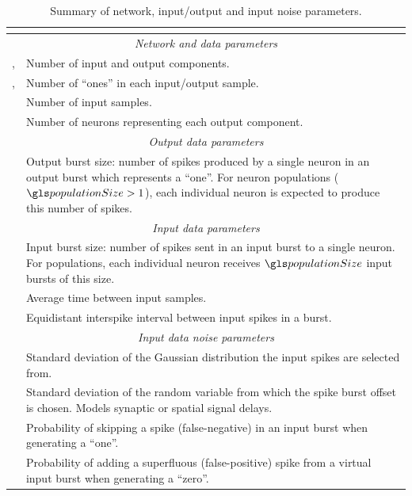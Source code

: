 \begin{table}
	\centering
	\small
	\begin{tabular}{r p{10.1cm}}
		\toprule
		\multicolumn{2}{c}{\spacedlowsmallcaps{Network and input/output parametrisation}} \\
		\midrule
		\multicolumn{2}{c}{\slshape Network and data parameters} \\
		\midrule
		\dimIn, \dimOut & Number of input and output components. \\[0.5em]
		\nOnesIn, \nOnesOut & Number of \enquote{ones} in each input/output sample.\\[0.5em]
		\nSamples & Number of input samples.\\[0.5em]
		\populationSize & Number of neurons representing each output component.\\
		\midrule
		\multicolumn{2}{c}{\slshape Output data parameters} \\
		\midrule
		\burstSizeOut & Output burst size: number of spikes produced by a single neuron in an output burst which represents a \enquote{one}. For neuron populations ($\populationSize > 1$), each individual neuron is expected to produce this number of spikes.\\
		\midrule
		\multicolumn{2}{c}{\slshape Input data parameters} \\
		\midrule
		\burstSizeIn & Input burst size: number of spikes sent in an input burst to a single neuron. For populations, each individual neuron receives $\populationSize$ input bursts of this size.\\[0.5em]
		\timeWindow & Average time between input samples.\\[0.5em]
		\isi & Equidistant interspike interval between input spikes in a burst.\\
		\midrule
		\multicolumn{2}{c}{\slshape Input data noise parameters} \\
		\midrule
		\jitter & Standard deviation of the Gaussian distribution the input spikes are selected from.\\[0.5em]
		\jitterOffs & Standard deviation of the random variable from which the spike burst offset is chosen. Models synaptic or spatial signal delays.\\[0.5em]
		\pFn & Probability of skipping a spike (false-negative) in an input burst when generating a \enquote{one}.\\[0.5em]
		\pFp & Probability of adding a superfluous (false-positive) spike from a virtual input burst when generating a \enquote{zero}.\\
		\bottomrule
	\end{tabular}
	\caption[Network and input/output parametrisation]{Summary of network,  input/output and input noise parameters.}
	\label{tbl:input_data_parametrisation}
\end{table}
